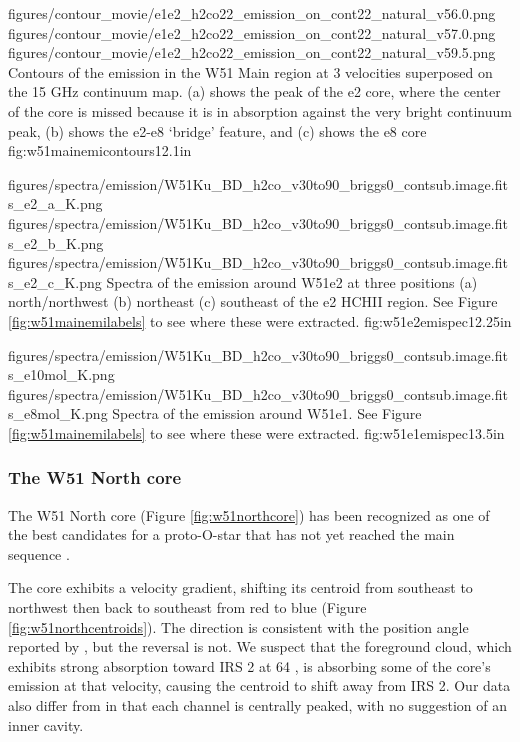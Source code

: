 \FigureThreeAA
{figures/contour_movie/e1e2_h2co22_emission_on_cont22_natural_v56.0.png}
{figures/contour_movie/e1e2_h2co22_emission_on_cont22_natural_v57.0.png}
{figures/contour_movie/e1e2_h2co22_emission_on_cont22_natural_v59.5.png}
{Contours of the \formaldehyde \twotwo emission in the W51 Main region at 3
velocities superposed on the 15 GHz continuum map.  (a) shows the peak of the e2
core, where the center of the core is missed because it is in absorption
against the very bright continuum peak, (b) shows the e2-e8 `bridge' feature,
and (c) shows the e8 core}
{fig:w51mainemicontours}{1}{2.1in}

\FigureThreeAA
{figures/spectra/emission/W51Ku_BD_h2co_v30to90_briggs0_contsub.image.fits_e2_a_K.png}
{figures/spectra/emission/W51Ku_BD_h2co_v30to90_briggs0_contsub.image.fits_e2_b_K.png}
{figures/spectra/emission/W51Ku_BD_h2co_v30to90_briggs0_contsub.image.fits_e2_c_K.png}
{Spectra of the \twotwo emission around W51e2 at three positions (a)
north/northwest (b) northeast (c) southeast of the e2 HCHII region.  See Figure
\ref{fig:w51mainemilabels} to see where these were extracted.}
{fig:w51e2emispec}{1}{2.25in}

\FigureTwoAA
{figures/spectra/emission/W51Ku_BD_h2co_v30to90_briggs0_contsub.image.fits_e10mol_K.png}
{figures/spectra/emission/W51Ku_BD_h2co_v30to90_briggs0_contsub.image.fits_e8mol_K.png}
{Spectra of the \twotwo emission around W51e1.  See Figure
\ref{fig:w51mainemilabels} to see where these were extracted.
}
{fig:w51e1emispec}{1}{3.5in}


\subsubsection{The W51 North core}
\label{sec:northcore}
The W51 North core (Figure \ref{fig:w51northcore}) has been recognized as one
of the best candidates for a proto-O-star that has not yet reached the main
sequence \citep{Zapata2009a,Zapata2010a,Goddi2015a}.  

The core exhibits a velocity gradient, shifting its centroid from southeast to
northwest then back to southeast from red to blue (Figure
\ref{fig:w51northcentroids}).  The direction is consistent
with the position angle reported by \citet{Zapata2010a}, but the reversal is
not.  We suspect that the foreground cloud, which exhibits strong absorption
toward IRS 2 at 64 \kms, is absorbing some of the core's emission at that
velocity, causing the centroid to shift away from IRS 2.  Our data also differ
from \citet{Zapata2010a} in that each channel is centrally peaked, with no
suggestion of an inner cavity.

